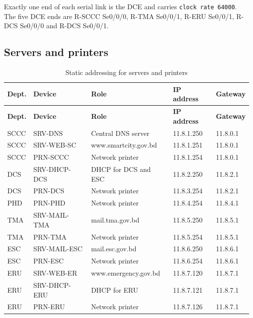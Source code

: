 \documentclass[11pt,a4paper]{article}
\newcommand{\netc}[1]{\texttt{\small #1}}
\begin{document}
\noindent
Exactly one end of each serial link is the DCE and carries
\netc{clock rate 64000}. The five DCE ends are
R-SCCC Se0/0/0, R-TMA Se0/0/1, R-ERU Se0/0/1, R-DCS Se0/0/0 and
R-DCS Se0/0/1.

\subsection{Servers and printers}

\begin{longtable}{@{}p{16mm}p{30mm}p{42mm}p{24mm}p{24mm}@{}}
\caption{Static addressing for servers and printers}\label{tab:servers}\\
\toprule
\textbf{Dept.} & \textbf{Device} & \textbf{Role} &
\textbf{IP address} & \textbf{Gateway} \\
\midrule
\endfirsthead
\toprule
\textbf{Dept.} & \textbf{Device} & \textbf{Role} &
\textbf{IP address} & \textbf{Gateway} \\
\midrule
\endhead
\bottomrule
\endfoot
SCCC & SRV-DNS       & Central DNS server        & 11.8.1.250 & 11.8.0.1 \\
SCCC & SRV-WEB-SC    & www.smartcity.gov.bd      & 11.8.1.251 & 11.8.0.1 \\
SCCC & PRN-SCCC      & Network printer           & 11.8.1.254 & 11.8.0.1 \\
\midrule
DCS  & SRV-DHCP-DCS  & DHCP for DCS and ESC      & 11.8.2.250 & 11.8.2.1 \\
DCS  & PRN-DCS       & Network printer           & 11.8.3.254 & 11.8.2.1 \\
\midrule
PHD  & PRN-PHD       & Network printer           & 11.8.4.254 & 11.8.4.1 \\
\midrule
TMA  & SRV-MAIL-TMA  & mail.tma.gov.bd           & 11.8.5.250 & 11.8.5.1 \\
TMA  & PRN-TMA       & Network printer           & 11.8.5.254 & 11.8.5.1 \\
\midrule
ESC  & SRV-MAIL-ESC  & mail.esc.gov.bd           & 11.8.6.250 & 11.8.6.1 \\
ESC  & PRN-ESC       & Network printer           & 11.8.6.254 & 11.8.6.1 \\
\midrule
ERU  & SRV-WEB-ER    & www.emergency.gov.bd      & 11.8.7.120 & 11.8.7.1 \\
ERU  & SRV-DHCP-ERU  & DHCP for ERU              & 11.8.7.121 & 11.8.7.1 \\
ERU  & PRN-ERU       & Network printer           & 11.8.7.126 & 11.8.7.1 \\
\end{longtable}
\end{document}

